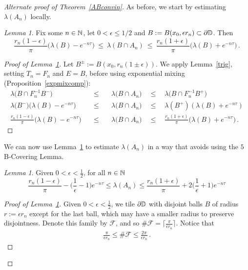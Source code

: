 \documentclass[11pt,reqno]{amsart}
\newcommand{\N}{{\Bbb N}}
\newcommand{\D}{{\Bbb D}}
\newcommand{\0}{\mathbf{0}}
\newtheorem{lemma}{Lemma}
\theoremstyle{remark}
\numberwithin{equation}{section}
\newtheorem{lemma}[theorem]{Lemma}
\theoremstyle{remark}
\numberwithin{equation}{section}
\begin{document}
\begin{proof}[Alternate proof of Theorem~\ref{ABconvin}]
As before, we start by estimating $\lambda(A_n)$ locally.
\begin{lemma}\label{ban}
Fix some $n \in \N$, let $0 <\epsilon \leq 1/2$ and $B:=B(x_0,\epsilon r_n) \subset \partial \D$. Then 
$$
\frac{r_n(1-\epsilon)}{\pi}\big(\lambda(B) - e^{-n\tau} \big) \: \leq \: \lambda(B \cap A_n) \: \leq \:
\frac{r_n(1+\epsilon)}{\pi}\big(\lambda(B)+e^{-n\tau} \big)  \, .
$$
    
\end{lemma}
\begin{proof}[Proof of Lemma~\ref{ban}]
Let $B^\pm:= B(x_0,r_n(1\pm\epsilon))$. We apply Lemma~\ref{trig}, setting $T_n=F_n$ and $E=B$, before using exponential mixing (Proposition~\ref{expmixcomp}):
\begin{eqnarray*}
    \lambda\big(B \cap F_n^{-1}B^- \big) \quad &\leq& \quad  \lambda \big( B \cap A_n \big) \quad  \leq \quad  \lambda\big(B \cap F_n^{-1}B^+ \big) \\  
    \lambda\big(B^- \big)\big(\lambda(B) - e^{-n\tau} \big)\quad  &\leq& \quad \lambda\big( B \cap A_n \big) \quad \leq \quad \lambda(B^+)(\lambda(B)+e^{-n\tau})
    \\ \frac{r_n(1-\epsilon)}{\pi}\big(\lambda(B) - e^{-n\tau} \big)\quad  & \leq& \quad  \lambda\big( B \cap A_n \big) \quad  \leq \quad \frac{r_n(1+\epsilon)}{\pi}\big(\lambda(B)+e^{-n\tau} \big) \, .
\end{eqnarray*}
\end{proof}
We can now use Lemma~\ref{ban} to estimate $\lambda(A_n)$ in a way that avoids using the $5$B-Covering Lemma.
\begin{lemma}\label{an} Given $0<\epsilon<\frac{1}{2}$, for all $n \in \N$
  $$ \frac{r_n(1-\epsilon)}{\pi} - \big(\frac{1}{\epsilon}-1\big) e^{-n\tau}\leq  \lambda(A_n) \leq \frac{r_n(1+\epsilon)}{\pi}+ 2\big(\frac{1}{\epsilon}+1\big)e^{-n\tau} $$
\end{lemma}
\begin{proof}[Proof of Lemma~\ref{an}]
 Given $0<\epsilon< \frac{1}{2}$, we tile $\partial \D$ with disjoint balls $B$ of radius $r:=\epsilon r_n$ except for the last ball, which may have a smaller radius to preserve disjointness. Denote this family by $\mathscr{F}$, and so $\# \mathscr{F}=  \lceil \frac{\pi}{\epsilon r_n} \rceil$. Notice that 
\begin{eqnarray}\label{fbound}
 \frac{\pi}{\epsilon r_n} \leq   \#\mathscr{F} \leq \frac{2\pi}{\epsilon r_n} \, .
\end{eqnarray}

\end{proof}
\end{proof}
\end{document}

